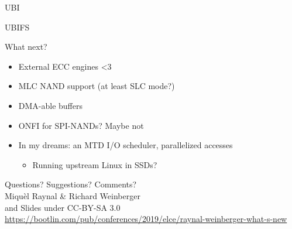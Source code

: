 \documentclass[aspectratio=169,obeyspaces,spaces,hyphens,dvipsnames]{beamer}
\begin{document}
\begin{frame}{UBI}
\end{frame}

\begin{frame}{UBIFS}
\end{frame}

\begin{frame}{What next?}
  \begin{itemize}
  \item External ECC engines <3
  \item MLC NAND support (at least SLC mode?)
  \item DMA-able buffers
  \item ONFI for SPI-NANDs? Maybe not
  \item In my dreams: an MTD I/O scheduler, parallelized accesses
    \begin{itemize}
    \item Running upstream Linux in SSDs?
    \end{itemize}
  \end{itemize}
\end{frame}

\begin{frame}
  \centering
  \Huge
  Questions? Suggestions? Comments?\\
  \vspace{0.5cm}
  \huge
  Miquèl Raynal \& Richard Weinberger\\
  \large
  \vspace{0.5cm}
  \hspace{2.6cm} and 
  \vspace{0.5cm}
  \newline Slides under CC-BY-SA 3.0\\
  \scriptsize
  \url{https://bootlin.com/pub/conferences/2019/elce/raynal-weinberger-what-s-new}
\end{frame}
\end{document}
